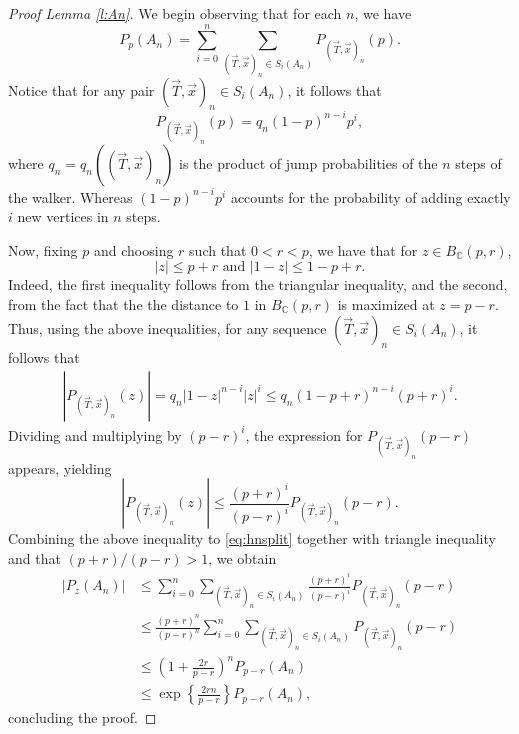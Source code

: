 \documentclass[a4paper]{amsart}
\begin{document}
\begin{proof}[Proof Lemma \ref{l:An}]
We begin observing that for each $n$, we have
\begin{equation}\label{eq:hnsplit}
    P_p(A_n) = \sum_{i=0}^n\sum_{(\vec{T}, \vec{x})_n  \in S_i(A_n)}P_{(\vec{T}, \vec{x})_n}(p ).
\end{equation}
    Notice that for any pair $(\vec{T}, \vec{x})_n \in S_{i}(A_n)$, it follows that 
    \begin{equation}
       P_{(\vec{T}, \vec{x})_n}(p ) = q_n(1-p)^{n-i}p^i,
    \end{equation}
where $q_n = q_n((\vec{T}, \vec{x})_n)$ is the product of jump probabilities of the $n$ steps of the walker. Whereas $(1-p)^{n-i}p^i$ accounts for the probability of adding exactly $i$ new vertices in $n$ steps.

Now, fixing $p$ and choosing $r$ such that $0<r<p$, we have that for $z \in B_{\mathbb{C}}(p,r)$,
\begin{equation}
    |z| \le p+r \text{ and }|1-z| \le 1-p+r.
\end{equation}
Indeed, the first inequality follows from the triangular inequality, and the second, from the fact that the the distance to $1$ in $B_{\mathbb{C}}(p,r)$ is maximized at $z = p - r$. Thus, using the above inequalities, for any sequence $(\vec{T}, \vec{x})_n \in S_{i}(A_n)$, it follows that
\begin{equation}
    \begin{split}
        \left|P_{(\vec{T}, \vec{x})_n}(z) \right|
        =
            q_n|1-z|^{n-i}|z|^i
        \leq 
            q_n(1-p+r)^{n-i}(p+r)^i.
    \end{split}
\end{equation}
Dividing and multiplying by $(p-r)^{i}$, the expression for $P_{(\vec{T}, \vec{x})_n}(p-r)$ appears, yielding
\begin{equation}
    |P_{(\vec{T}, \vec{x})_n}(z)| \le \frac{(p+r)^{i}}{(p-r)^{i}}P_{(\vec{T}, \vec{x})_n}(p-r).
\end{equation}
Combining the above inequality to \eqref{eq:hnsplit} together with triangle inequality and that $(p+r)/(p-r) > 1$, we obtain
\begin{equation}
    \begin{split}
        |P_z(A_n)| & \le \sum_{i=0}^n\sum_{(\vec{T}, \vec{x})_n\in S_{i}(A_n)}\frac{(p+r)^{i}}{(p-r)^{i}}P_{(\vec{T}, \vec{x})_n}(p-r)\\
        &\le \frac{(p+r)^{n}}{(p-r)^{n}}\sum_{i=0}^n\sum_{(\vec{T}, \vec{x})_n\in S_{i}(A_n)}P_{(\vec{T}, \vec{x})_n}(p-r) \\
        & \leq 
        \left( 1 + \frac{2r}{p-r}\right)^n P_{p-r}(A_n) \\
        & \leq 
        \exp\left\{
        \frac{2rn}{p-r}\right\}
        P_{p-r}(A_n),
    \end{split}
\end{equation}
concluding the proof.
    
\end{proof}
\end{document}
